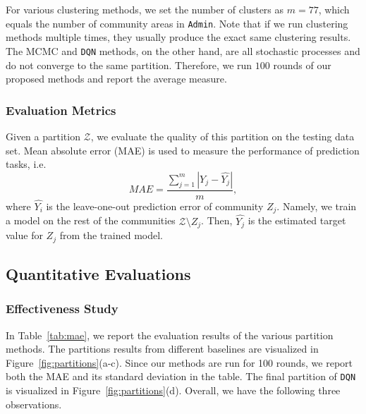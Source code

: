 For various clustering methods, we set the number of clusters as $m=77$, which equals the number of community areas in \texttt{Admin}. Note that if we run clustering methods multiple times, they usually produce the exact same clustering results. The MCMC and \texttt{DQN} methods, on the other hand, are all stochastic processes and do not converge to the same partition. Therefore, we run $100$ rounds of our proposed methods and report the average measure.



\subsubsection{Evaluation Metrics} 


Given a partition $\mathcal{Z}$, we evaluate the quality of this partition on the testing data set.
Mean absolute error (MAE) is used to measure the performance of prediction tasks, i.e.
\begin{equation}
MAE = \frac{ \sum_{j=1}^m |Y_j - \hat{Y_j}| }{ m},
\end{equation}
where $\hat{Y_i}$ is the leave-one-out prediction error of community $Z_j$. Namely, we train a model on the rest of the communities $\mathcal{Z} \setminus Z_j$. Then, $\hat{Y_j}$ is the estimated target value for $Z_j$ from the trained model.


\subsection{Quantitative Evaluations}

\subsubsection{Effectiveness Study}

In Table~\ref{tab:mae}, we report the evaluation results of the various partition methods. The partitions results from different baselines are visualized in Figure~\ref{fig:partitions}(a-c). Since our methods are run for 100 rounds, we report both the MAE and its standard deviation in the table. The final partition of \texttt{DQN} is visualized in Figure~\ref{fig:partitions}(d). Overall, we have the following three observations.


